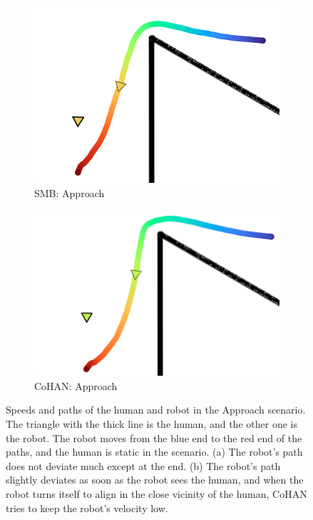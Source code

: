 \begin{figure}[h!]
\begin{subfigure}{.5\columnwidth}
\end{subfigure}
\vspace{0.15cm}
\begin{subfigure}{.45\columnwidth}
  \includegraphics[width=\textwidth]{images/chapter6/smb/approach.png}
  \caption{SMB: Approach}
\end{subfigure}
\hspace{0.15cm}
\begin{subfigure}{.45\columnwidth}
  \includegraphics[width=\textwidth]{images/chapter6/cohan/approach.png}
  \caption{CoHAN: Approach}
\end{subfigure}
\caption{Speeds and paths of the human and robot in the Approach scenario. The triangle with the thick line is the human, and the other one is the robot. The robot moves from the blue end to the red end of the paths, and the human is static in the scenario. (a) The robot's path does not deviate much except at the end. (b) The robot's path slightly deviates as soon as the robot sees the human, and when the robot turns itself to align in the close vicinity of the human, CoHAN tries to keep the robot's velocity low.}
\label{fig:paths_approach}
\end{figure}
